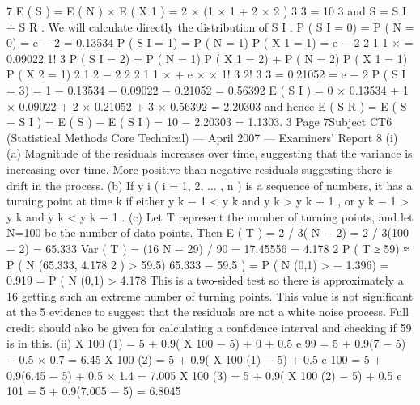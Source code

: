 \documentclass[a4paper,12pt]{article}
\begin{document}
\begin{enumerate}

7
E ( S ) = E ( N ) × E ( X 1 )
= 2 × (1 × 1 + 2 × 2 )
3
3
= 10
3
and S = S I + S R .
We will calculate directly the distribution of S I .
P ( S I = 0) = P ( N = 0) = e − 2 = 0.13534
P ( S I = 1) = P ( N = 1) P ( X 1 = 1) = e − 2
2 1 1
× = 0.09022
1! 3
P ( S I = 2) = P ( N = 1) P ( X 1 = 2) + P ( N = 2) P ( X 1 = 1) P ( X 2 = 1)
2 1 2 − 2 2 2 1 1
× + e
× ×
1! 3
2! 3 3
= 0.21052
= e − 2
P ( S I = 3) = 1 − 0.13534 − 0.09022 − 0.21052 = 0.56392
E ( S I ) = 0 × 0.13534 + 1 × 0.09022 + 2 × 0.21052 + 3 × 0.56392
= 2.20303
and hence
E ( S R ) = E ( S − S I ) = E ( S ) − E ( S I ) = 10 − 2.20303 = 1.1303.
3
Page 7Subject CT6 (Statistical Methods Core Technical) — April 2007 — Examiners’ Report
8
(i)
(a)
Magnitude of the residuals increases over time, suggesting that the
variance is increasing over time.
More positive than negative residuals suggesting there is drift in the
process.
(b)
If y i ( i = 1, 2, ... , n ) is a sequence of numbers, it has a turning point at
time k if either y k − 1 < y k and y k > y k + 1 , or y k − 1 > y k and y k < y k + 1 .
(c)
Let T represent the number of turning points, and let N=100 be the
number of data points. Then
E ( T ) = 2 / 3( N − 2) = 2 / 3(100 − 2) = 65.333
Var ( T ) = (16 N − 29) / 90 = 17.45556 = 4.178 2
P ( T ≥ 59) ≈ P ( N (65.333, 4.178 2 ) > 59.5)
65.333 − 59.5
) = P ( N (0,1) > − 1.396) = 0.919
= P ( N (0,1) >
4.178
This is a two-sided test so there is approximately a 16%
getting such an extreme number of turning points. This value is not
significant at the 5%
evidence to suggest that the residuals are not a white noise process.
Full credit should also be given for calculating a confidence interval and
checking if 59 is in this.
(ii)
X 100 (1) = 5 + 0.9( X 100 − 5) + 0 + 0.5 e 99 = 5 + 0.9(7 − 5) − 0.5 × 0.7 = 6.45
X 100 (2) = 5 + 0.9( X 100 (1) − 5) + 0.5 e 100 = 5 + 0.9(6.45 − 5) + 0.5 × 1.4 = 7.005
X 100 (3) = 5 + 0.9( X 100 (2) − 5) + 0.5 e 101 = 5 + 0.9(7.005 − 5) = 6.8045




\end{enumerate}
\end{document}
